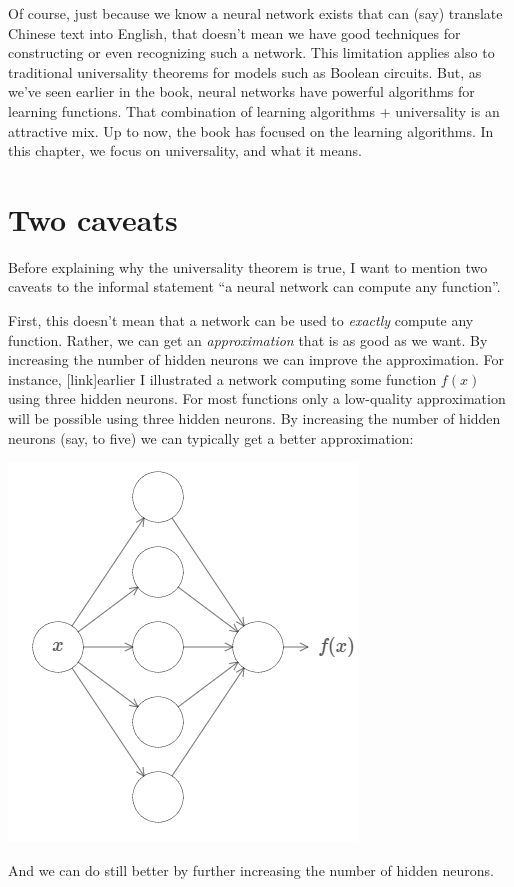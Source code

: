 \documentclass[a4paper,twoside,10pt]{book}
\begin{document}
Of course, just because we know a neural network exists that can (say) translate Chinese text into English, that doesn't mean we have good techniques for constructing or even recognizing such a network. This limitation applies also to traditional universality theorems for models such as Boolean circuits. But, as we've seen earlier in the book, neural networks have powerful algorithms for learning functions. That combination of learning algorithms + universality is an attractive mix. Up to now, the book has focused on the learning algorithms. In this chapter, we focus on universality, and what it means.


\section{Two caveats}
Before explaining why the universality theorem is true, I want to mention two caveats to the informal statement ``a neural network can compute any function''.

First, this doesn't mean that a network can be used to \textit{exactly} compute any function. Rather, we can get an \textit{approximation} that is as good as we want. By increasing the number of hidden neurons we can improve the approximation. For instance, [link]earlier I illustrated a network computing some function $f(x)$ using three hidden neurons. For most functions only a low-quality approximation will be possible using three hidden neurons. By increasing the number of hidden neurons (say, to five) we can typically get a better approximation:
\begin{center}
	\includegraphics[width=0.55\linewidth]{figures/ch4/tikz402}
\end{center}
And we can do still better by further increasing the number of hidden neurons.
\end{document}
